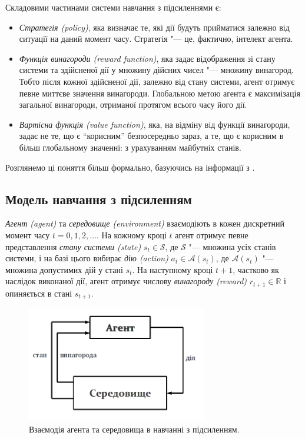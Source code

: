 Складовими частинами системи навчання з підсиленнями є:
\begin{itemize}
\item \emph{Стратегія (policy)}, яка визначає те, які дії будуть прийматися
залежно від ситуації на даний момент часу. Стратегія "--- це, фактично, інтелект агента.
\item \emph{Функція винагороди (reward function)}, яка задає відображення зі стану системи та здійсненої дії у множину дійсних чисел "--- множину винагород. Тобто після кожної здійсненої дії, залежно від стану системи, агент отримує певне миттєве значення винагороди. Глобальною метою агента є максимізація загальної винагороди, отриманої протягом всього часу його дії.
\item \emph{Вартісна функція (value function)}, яка, на відміну від функції винагороди, задає не те, що є ``корисним'' безпосередньо зараз, а те, що є корисним в більш глобальному значенні: з урахуванням майбутніх станів.
\end{itemize}

Розглянемо ці поняття більш формально, базуючись на інформації з \cite{SuttonBarto2002}.

\subsection{Модель навчання з підсиленням}

\emph{Агент (agent)} та \emph{середовище (environment)} взаємодіють в кожен дискретний момент часу $t=0,1,2,\dots$. На кожному кроці $t$ агент отримує певне представлення \emph{стану системи (state)} $s_t \in \mathcal{S}$, де $\mathcal{S}$ "--- множина усіх станів системи, і на базі цього вибирає \emph{дію (action)} $a_t \in \mathcal{A}(s_t)$, де $\mathcal{A}(s_t)$ "--- множина допустимих дій у стані $s_t$. На наступному кроці $t+1$, частково як наслідок виконаної дії, агент отримує числову \emph{винагороду (reward)} $r_{t+1} \in \mathbb{R}$ і опиняється в стані $s_{t+1}$.

\begin{figure}[!h]
\centering
\includegraphics[width=0.7\textwidth]{agent_env_diagram.png}
\caption{Взаємодія агента та середовища в навчанні з підсиленням.}
\end{figure}

